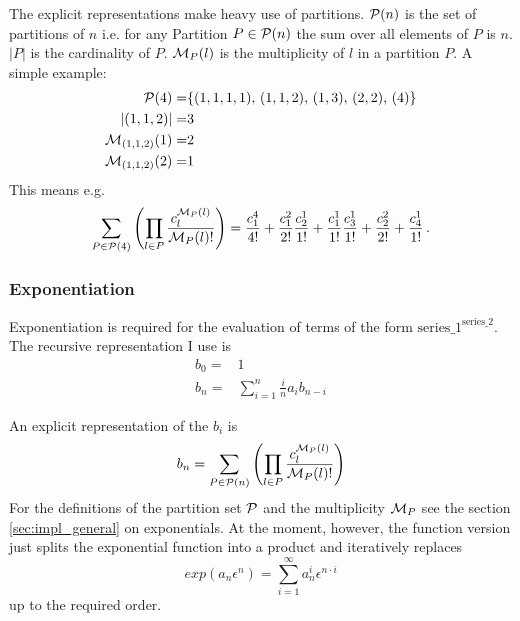 \documentclass{article}
\begin{document}
The explicit representations make heavy use of partitions.
${\cal P}(n)$ is the set of partitions of $n$ i.e. for any
Partition $P \in {\cal P}(n)$ the sum over all elements of $P$ is
$n$. $|P|$ is the cardinality of $P$.
${\cal M}_P(l)$ is the multiplicity of $l$ in a partition $P$. A simple
example:
\begin{align*}
  {\cal P}(4)=&\{(1,1,1,1),\,(1,1,2),\,(1,3),\,(2,2),\,(4)\}\\
  |(1,1,2)|=&3\\
  {\cal M}_{(1,1,2)}(1)=&2\\
  {\cal M}_{(1,1,2)}(2)=&1\\
\end{align*}
This means e.g. 
\begin{equation}
  \label{eq:exp_ex}
\sum_{P \in {\cal P}(4)} \left(\prod_{l \in P} \frac{c^{{\cal M}_P(l)}_l}{{\cal M}_P(l)!} \right)=
  \frac{c_1^4}{4!}+\frac{c_1^2}{2!}\frac{c_2^1}{1!}+\frac{c_1^1}{1!}\frac{c_3^1}{1!}+\frac{c_2^2}{2!}+\frac{c_4^1}{1!}\,.
\end{equation}


\subsubsection{Exponentiation}
\label{sec:impl_exp}

Exponentiation is required for the evaluation of terms of the form
$\text{series\_1}^{\text{series\_2}}$.
The recursive representation I use is
\begin{align}
  \label{eq:exp_rec}
b_0=&1\\
b_n =&  \sum_{i=1}^{n} \frac{i}{n} a_{i}b_{n-i}
\end{align}

An explicit representation of the $b_i$ is
\begin{equation}
  \label{eq:exp}
  \begin{split}
    b_n=
\sum_{P \in {\cal P}(n)} \left(\prod_{l \in P} \frac{c^{{\cal M}_P(l)}_l}{{\cal M}_P(l)!} \right)
  \end{split}
\end{equation}
For the definitions of the partition set ${\cal P}$ and the
multiplicity ${\cal M}_P$ see the section \ref{sec:impl_general} on
exponentials.
 At the moment, however, the function version just splits the
 exponential function into a product and iteratively replaces
 \begin{equation}
   \label{eq:exp_simple}
   exp(a_n \epsilon^n)=\sum_{i=1}^\infty a_n^i \epsilon^{n\cdot i}
 \end{equation}
up to the required order.
\end{document}
